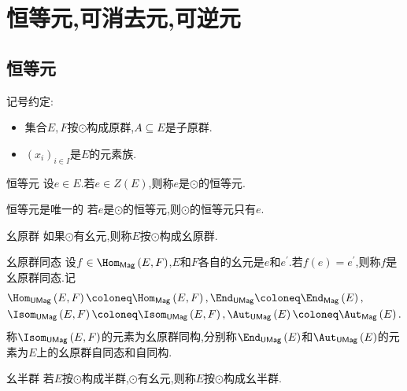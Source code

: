 \chapter{恒等元,可消去元,可逆元}

\section{恒等元}

记号约定:
	\begin{itemize}
		\item 集合$E,F$按$\odot$构成原群,$A\subseteq E$是子原群.
		\item $\left(x_{i}\right)_{i\in I}$是$E$的元素族.
	\end{itemize}

\begin{definition}{恒等元}{}
	设$e\in E$.若$e\in Z\left(E\right)$,则称$e$是$\odot$的恒等元.
\end{definition}

\begin{lemma}{恒等元是唯一的}{}
	若$e$是$\odot$的恒等元,则$\odot$的恒等元只有$e$.
\end{lemma}

\begin{definition}{幺原群}{}
	如果$\odot$有幺元,则称$E$按$\odot$构成幺原群.
\end{definition}

\begin{definition}{幺原群同态}{}
	设$f\in\Hom_{\mathsf{Mag}}\left(E,F\right)$,$E$和$F$各自的幺元是$e$和$e^{\prime}$.若$f\left(e\right)=e^{\prime}$,则称$f$是幺原群同态.记
	\begin{align*}
		&\Hom_{\mathsf{UMag}}\left(E,F\right)\coloneq\Hom_{\mathsf{Mag}}\left(E,F\right),\End_{\mathsf{UMag}}\coloneq\End_{\mathsf{Mag}}\left(E\right),\\
		&\Isom_{\mathsf{UMag}}\left(E,F\right)\coloneq\Isom_{\mathsf{UMag}}\left(E,F\right),\Aut_{\mathsf{UMag}}\left(E\right)\coloneq\Aut_{\mathsf{Mag}}\left(E\right).
	\end{align*}
	称$\Isom_{\mathsf{UMag}}\left(E,F\right)$的元素为幺原群同构,分别称$\End_{\mathsf{UMag}}\left(E\right)$和$\Aut_{\mathsf{UMag}}\left(E\right)$的元素为$E$上的幺原群自同态和自同构.
\end{definition}

\begin{definition}{幺半群}{}
	若$E$按$\odot$构成半群,$\odot$有幺元,则称$E$按$\odot$构成幺半群.
\end{definition}

